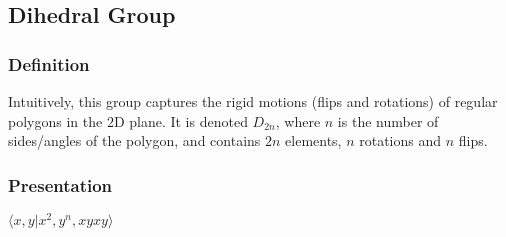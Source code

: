 \subsection{Dihedral Group}\label{dihedralgroup}

\subsubsection{Definition}

Intuitively, this group captures the rigid motions (flips and rotations) of regular polygons in the $2$D plane. It is denoted
$D_{2n}$, where $n$ is the number of sides/angles of the polygon, and contains $2n$ elements, $n$ rotations and $n$ flips.

\subsubsection{Presentation}

$\langle x,y | x^2, y^n, xyxy \rangle$